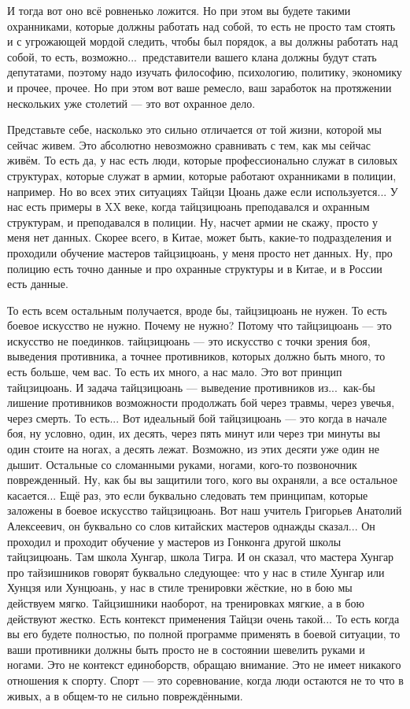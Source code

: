 И тогда вот оно 
всё ровненько ложится. Но при этом вы будете такими 
охранниками, которые должны работать над собой, то 
есть не просто там стоять и с угрожающей мордой
следить, чтобы был порядок, а вы должны
работать над собой, то есть, возможно...\ представители 
вашего клана должны будут стать депутатами, поэтому 
надо изучать философию, психологию, политику,  
экономику и прочее, прочее.  Но при этом вот ваше 
ремесло, ваш заработок на протяжении нескольких уже 
столетий --- это вот охранное дело.

Представьте себе,  
насколько это сильно отличается от той жизни, которой 
мы сейчас живем. Это абсолютно невозможно сравнивать 
с тем, как мы сейчас живём.  То есть да, у нас есть люди, 
которые профессионально служат в силовых структурах,  
которые служат в армии, которые работают охранниками 
в полиции, например. Но во всех этих ситуациях Тайцзи 
Цюань даже если используется... У нас есть примеры в XX 
веке, когда тайцзицюань преподавался и охранным 
структурам,  и преподавался в полиции.  Ну, насчет 
армии не скажу, просто у меня нет данных. Скорее всего, 
в Китае, может быть, какие-то подразделения и 
проходили обучение мастеров тайцзицюань, у меня 
просто нет данных. Ну, про полицию есть точно данные и 
про охранные структуры и в Китае, и в России есть 
данные.

То есть всем остальным получается, вроде бы, 
тайцзицюань не нужен.  То есть боевое искусство не 
нужно. Почему не нужно? Потому что тайцзицюань --- это 
искусство не поединков. тайцзицюань --- это искусство 
с точки зрения боя, выведения противника, а точнее 
противников, которых должно быть много, то есть 
больше,  чем вас.  То есть их много, а нас мало. Это вот 
принцип тайцзицюань.  И задача тайцзицюань --- 
выведение противников из...\ как-бы лишение противников 
возможности продолжать бой через травмы, через 
увечья, через смерть. То есть... Вот идеальный бой тайцзицюань
--- это когда в начале боя, ну условно,  один, их 
десять, через пять минут или через три минуты вы один 
стоите на ногах, а десять лежат. Возможно, из этих 
десяти уже один не дышит. Остальные со сломанными 
руками, ногами, кого-то позвоночник поврежденный.  Ну, 
как бы вы защитили того, кого вы охраняли, а все 
остальное касается... Ещё раз, это если буквально 
следовать тем принципам, которые заложены в боевое 
искусство тайцзицюань. Вот наш учитель Григорьев 
Анатолий Алексеевич, он буквально со слов китайских 
мастеров однажды сказал... Он проходил и проходит 
обучение у мастеров из Гонконга другой школы тайцзицюань.
Там школа Хунгар, школа Тигра. И он сказал, что 
мастера Хунгар про тайзишников говорят буквально 
следующее: что у нас в стиле Хунгар или Хунцзя или
Хунцюань, у нас в стиле тренировки жёсткие, но 
в бою мы действуем мягко. Тайцзишники наоборот, на 
тренировках мягкие, а в бою действуют жестко. Есть 
контекст применения Тайцзи очень такой... То есть 
когда вы его будете полностью, по полной программе 
применять в боевой ситуации, то ваши противники 
должны быть просто не в состоянии шевелить руками и 
ногами. Это не контекст единоборств, обращаю внимание. 
Это не имеет никакого отношения к спорту. Спорт --- это 
соревнование, когда люди остаются не то что в живых, а 
в общем-то не сильно повреждёнными.

